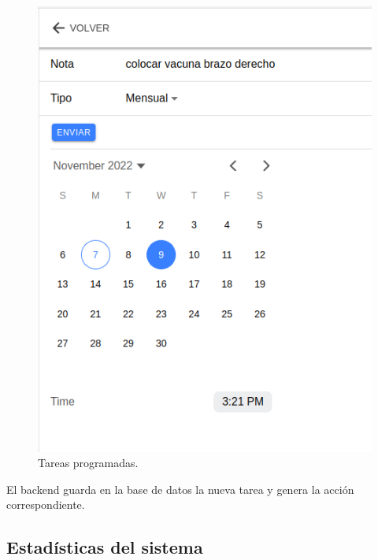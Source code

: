 \begin{figure}[ht]
	\centering
	\includegraphics[scale=.40]{./Figures/tarea-programada.png}
	\caption{Tareas programadas.}
	\label{fig:Tareas programadas.}
\end{figure} 

El backend guarda en la base de datos la nueva tarea y genera la acción correspondiente.

\pagebreak
\subsection{Estadísticas del sistema}

